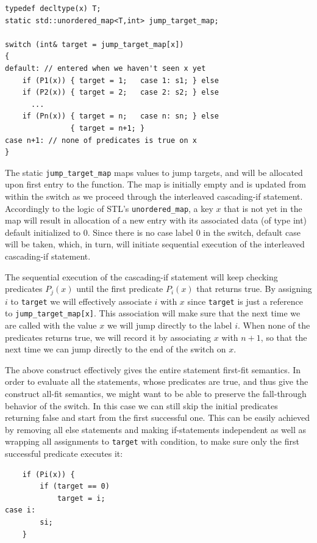 \documentclass[preprint]{sigplanconf}
\makeatletter
\DeclareRobustCommand{\code}[1]{{\lstinline[breaklines=false,escapechar=@]{#1}}}
\makeatother
\begin{document}
\begin{lstlisting}
typedef decltype(x) T;
static std::unordered_map<T,int> jump_target_map;

switch (int& target = jump_target_map[x])
{
default: // entered when we haven't seen x yet
    if (P1(x)) { target = 1;   case 1: s1; } else 
    if (P2(x)) { target = 2;   case 2: s2; } else
      ...
    if (Pn(x)) { target = n;   case n: sn; } else
               { target = n+1; }
case n+1: // none of predicates is true on x
}
\end{lstlisting}

The static \code{jump_target_map} maps values to jump targets, and will be 
allocated upon first entry to the function. The map is initially empty and is 
updated from within the switch as we proceed through the interleaved 
cascading-if statement. Accordingly to the logic of STL's \code{unordered_map}, 
a key $x$ that is not yet in the map will result in allocation of a new entry 
with its associated data (of type int) default initialized to 0. Since there is 
no case label 0 in the switch, default case will be taken, which, in turn, will 
initiate sequential execution of the interleaved cascading-if statement.

The sequential execution of the cascading-if statement will keep checking 
predicates $P_j(x)$ until the first predicate $P_i(x)$ that returns true. By 
assigning $i$ to \code{target} we will effectively associate $i$ with $x$ since 
\code{target} is just a reference to \code{jump_target_map[x]}. This association 
will make sure that the next time we are called with the value $x$ we will jump 
directly to the label $i$. When none of the predicates returns true, we will 
record it by associating $x$ with $n+1$, so that the next time we can jump 
directly to the end of the switch on $x$. 

The above construct effectively gives the entire statement first-fit semantics. 
In order to evaluate all the statements, whose predicates are true, and thus 
give the construct all-fit semantics, we might want to be able to preserve the 
fall-through behavior of the switch. In this case we can still skip the initial 
predicates returning false and start from the first successful one. This can be 
easily achieved by removing all else statements and making if-statements 
independent as well as wrapping all assignments to \code{target} with condition, 
to make sure only the first successful predicate executes it:

\begin{lstlisting}
    if (Pi(x)) { 
        if (target == 0)
            target = i;
case i:
        si;
    }
\end{lstlisting}
\end{document}
